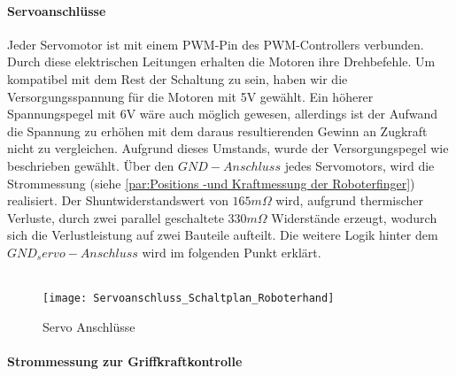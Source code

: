 \documentclass[titlepage,12pt,twoside]{article}
\begin{document}
\paragraph{Servoanschlüsse}
\hfill \break
\hfill \break
Jeder Servomotor ist mit einem PWM-Pin des PWM-Controllers verbunden. Durch diese elektrischen Leitungen erhalten die Motoren ihre Drehbefehle. Um kompatibel mit dem Rest der Schaltung zu sein, haben wir die Versorgungsspannung für die Motoren mit
5V gewählt. Ein höherer Spannungspegel mit 6V wäre auch möglich gewesen, allerdings ist der Aufwand die Spannung zu erhöhen mit dem daraus resultierenden Gewinn an Zugkraft nicht zu vergleichen. Aufgrund dieses Umstands, wurde der Versorgungspegel
wie beschrieben gewählt. Über den $GND-Anschluss$ jedes Servomotors, wird die Strommessung (siehe \autoref{par:Positions -und Kraftmessung der Roboterfinger}) realisiert. Der Shuntwiderstandswert von $165m\Omega$ wird, aufgrund thermischer Verluste, durch zwei parallel geschaltete $330m\Omega$ 
Widerstände erzeugt, wodurch sich die Verlustleistung auf zwei Bauteile aufteilt. Die weitere Logik hinter dem $GND_servo-Anschluss$ wird im folgenden Punkt erklärt. \\
\\
\begin{figure}[H]
	\begin{center}
		\scalebox{1.0}
		{\texttt{[image: Servoanschluss\_Schaltplan\_Roboterhand]}}
		\caption{Servo Anschlüsse}
		\label{fig:Servoanschluss_Schaltplan_Roboterhand}		
	\end{center}
\end{figure}
\hfill \break

\paragraph{Strommessung zur Griffkraftkontrolle}
\hfill \break
\hfill \break
\end{document}
